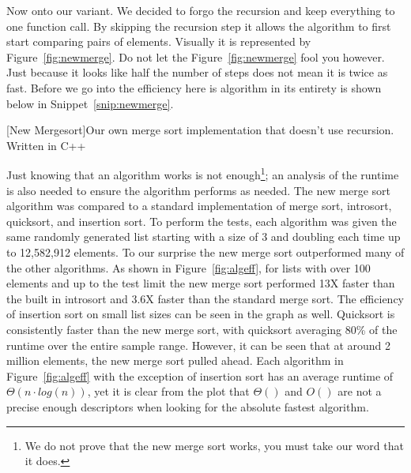 \documentclass[12pt]{article}
\begin{document}
	Now onto our variant.
	We decided to forgo the recursion and keep everything to one function call.
	By skipping the recursion step it allows the algorithm to first start comparing pairs of elements.
	Visually it is represented by Figure~\ref{fig:newmerge}.
	Do not let the Figure~\ref{fig:newmerge} fool you however.
	Just because it looks like half the number of steps does not mean it is twice as fast.
	Before we go into the efficiency here is algorithm in its entirety is shown below in Snippet~\ref{snip:newmerge}.
	
	\begin{center}
		[New Mergesort]{Our own merge sort implementation that doesn't use recursion. Written in C++}
		
		\label{snip:newmerge}
	\end{center}

	Just knowing that an algorithm works is not enough\footnote{We do not prove that the new merge sort works, you must take our word that it does.}; an analysis of the runtime is also needed to ensure the algorithm performs as needed.
	The new merge sort algorithm was compared to a standard implementation of merge sort, introsort, quicksort, and insertion sort.
	To perform the tests, each algorithm was given the same randomly generated list starting with a size of 3 and doubling each time up to 12,582,912 elements.
	To our surprise the new merge sort outperformed many of the other algorithms.
	As shown in Figure~\ref{fig:algeff}, for lists with over 100 elements and up to the test limit the new merge sort performed 13X faster than the built in introsort and 3.6X faster than the standard merge sort.
	The efficiency of insertion sort on small list sizes can be seen in the graph as well.
	Quicksort is consistently faster than the new merge sort, with quicksort averaging 80\% of the runtime over the entire sample range.
	However, it can be seen that at around 2 million elements, the new merge sort pulled ahead.
	Each algorithm in Figure~\ref{fig:algeff} with the exception of insertion sort has an average runtime of $\Theta( n \cdot log (n) )$, yet it is clear from the plot that $\Theta()$ and $O()$ are not a precise enough descriptors when looking for the absolute fastest algorithm.
\end{document}
